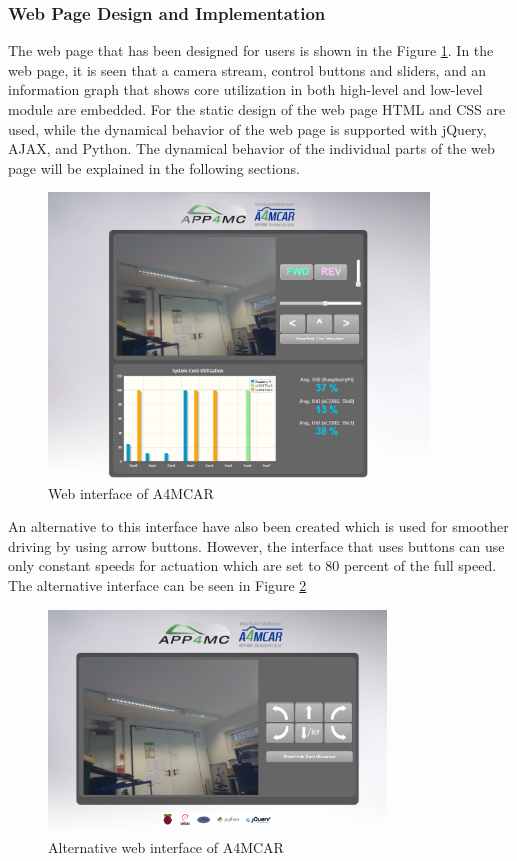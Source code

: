 \subsubsection{Web Page Design and Implementation} 
The web page that has been designed for users is shown in the Figure \ref{fig:web}. In the web page, it is seen that a camera stream, control buttons and sliders, and an information graph that shows core utilization in both high-level and low-level module are embedded. For the static design of the web page HTML and CSS are used, while the dynamical behavior of the web page is supported with jQuery, AJAX, and Python. The dynamical behavior of the individual parts of the web page will be explained in the following sections.
\begin{figure}[!ht]
	\centering
	\includegraphics[width=0.9\textwidth]{content/images/web.png}
	\caption{Web interface of A4MCAR}
	\label{fig:web}
\end{figure}

An alternative to this interface have also been created which is used for smoother driving by using arrow buttons. However, the interface that uses buttons can use only constant speeds for actuation which are set to 80 percent of the full speed. The alternative interface can be seen in Figure \ref{fig:web2}

\begin{figure}[!ht]
	\centering
	\includegraphics[width=0.8\textwidth]{content/images/web2.png}
	\caption{Alternative web interface of A4MCAR}
	\label{fig:web2}
\end{figure}

